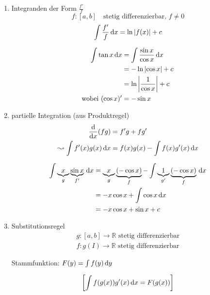 \begin{enumerate}
	\item Integranden der Form $\frac{f'}{f}$ \\
	\[
		f: [a, b] \quad\text{stetig differenzierbar, } f \neq 0
	\]
	\[
		\int \frac{f'}{f} \,\mathrm d x = \ln \left|f(x)\right| + c
	\]
	
	\begin{example}
		\begin{align*}
			\int \tan x \,\mathrm d x &= \int \frac{\sin x}{\cos x} \,\mathrm d x \\
			&= - \ln \left|\cos x\right| + c \\
			&= \ln \left|\frac{1}{\cos x}\right| + c \\
			\text{wobei } (\cos x)' &= - \sin x
		\end{align*}
	\end{example}
	
	\item partielle Integration (aus Produktregel)
	\begin{align*}
		\frac{\mathrm d}{\mathrm d x} (f g) &= f' g + f g' \\
		\leadsto \int f'(x) g(x) \,\mathrm d x &= f(x) g(x) - \int f(x) g'(x) \,\mathrm d x
	\end{align*}
	
	\begin{example}
		\begin{align*}
			\int \underbrace{x}_g \underbrace{\sin x}_{f'} \,\mathrm d x &= \underbrace{x}_g \underbrace{(- \cos x)}_f - \int \underbrace{1}_{g'} \underbrace{(- \cos x)}_f \,\mathrm d x \\
			&= -x \cos x + \int \cos x \,\mathrm d x \\
			&= -x \cos x + \sin x + c
		\end{align*}
	\end{example}
	
	\item Substitutionsregel
		\begin{align*}
			g: [a, b] \to \mathbb{R} \text{ stetig differenzierbar} \\
			f: g(I) \to \mathbb{R} \text{ stetig differenzierbar}
		\end{align*}
		
		Stammfunktion: $F(y) = \int f(y) \,\mathrm d y$
		
		\begin{equation*}
			\left[ \int f(g(x)) g'(x) \,\mathrm d x = F(g(x)) \right]
		\end{equation*}
		

\end{enumerate}
